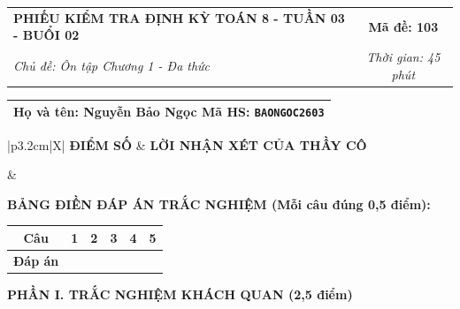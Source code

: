 \documentclass[12pt,a4paper]{article}
\begin{document}
\newpage


\noindent
\begin{tabularx}{\linewidth}{|X|c|}
\hline
\textbf{PHIẾU KIỂM TRA ĐỊNH KỲ TOÁN 8 - TUẦN 03 - BUỔI 02} & \textbf{Mã đề: 103} \\
\textit{Chủ đề: Ôn tập Chương 1 - Đa thức} & \textit{Thời gian: 45 phút} \\
\hline
\end{tabularx}

\vspace{1mm}

\noindent
\begin{tabularx}{\linewidth}{|X|}
\hline
\rule[-2mm]{0pt}{7.5mm}\textbf{Họ và tên:} \textbf{\large Nguyễn Bảo Ngọc} \hfill \textbf{Mã HS:} \texttt{BAONGOC2603} \quad \\
\hline
\end{tabularx}

\vspace{1mm}

\noindent
\begin{tabularx}{\linewidth}{|p{3.2cm}|X|}
\hline
\centering\textbf{ĐIỂM SỐ} & \centering\textbf{LỜI NHẬN XÉT CỦA THẦY CÔ} \tabularnewline
\hline
\rule{0pt}{1.3cm} & \tabularnewline
\hline
\end{tabularx}

\vspace{1.2mm}

\noindent\textbf{BẢNG ĐIỀN ĐÁP ÁN TRẮC NGHIỆM (Mỗi câu đúng 0,5 điểm):}
\vspace{0.8mm}

\noindent
\renewcommand{\arraystretch}{1.35}
\begin{tabularx}{\linewidth}{|c|*{5}{>{\centering\arraybackslash}X|}}
\hline
\textbf{Câu} & \textbf{1} & \textbf{2} & \textbf{3} & \textbf{4} & \textbf{5} \\
\hline
\textbf{Đáp án} & & & & & \\
\hline
\end{tabularx}
\renewcommand{\arraystretch}{1.0}

\vspace{1.5mm}

\noindent\textbf{\large PHẦN I. TRẮC NGHIỆM KHÁCH QUAN (2,5 điểm)}
\vspace{1mm}
\end{document}

